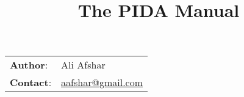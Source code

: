 \documentclass[10pt,a4paper,english]{article}
\title{The PIDA Manual}
\author{}
\date{}
\newlength{\docinfowidth}
\newlength{\locallinewidth}
\begin{document}
\maketitle

\begin{center}
\begin{tabularx}{\docinfowidth}{lX}
\textbf{Author}: &
	Ali Afshar \\
\textbf{Contact}: &
	\href{mailto:aafshar@gmail.com}{aafshar@gmail.com} \\
\end{tabularx}
\end{center}

\setlength{\locallinewidth}{\linewidth}
\hypertarget{table-of-contents}{}
\end{document}
